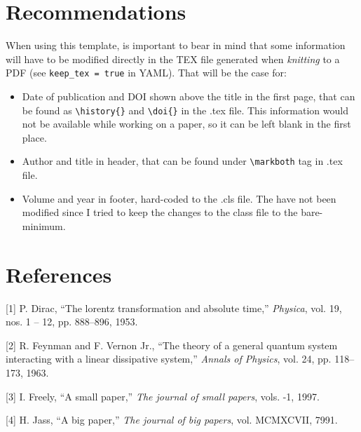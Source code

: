 \documentclass[]{latex/ieeeaccess}
\providecommand{\tightlist}{%
  \setlength{\itemsep}{0pt}\setlength{\parskip}{0pt}}
\begin{document}
\hypertarget{recommendations}{%
\section{Recommendations}\label{recommendations}}

When using this template, is important to bear in mind that some
information will have to be modified directly in the TEX file generated
when \emph{knitting} to a PDF (see \texttt{keep\_tex\ =\ true} in YAML).
That will be the case for:

\begin{itemize}
\tightlist
\item
  Date of publication and DOI shown above the title in the first page,
  that can be found as \texttt{\textbackslash{}history\{\}} and
  \texttt{\textbackslash{}doi\{\}} in the .tex file. This information
  would not be available while working on a paper, so it can be left
  blank in the first place.
\item
  Author and title in header, that can be found under
  \texttt{\textbackslash{}markboth} tag in .tex file.
\item
  Volume and year in footer, hard-coded to the .cls file. The have not
  been modified since I tried to keep the changes to the class file to
  the bare-minimum.
\end{itemize}

\hypertarget{references}{%
\section*{References}\label{references}}

\hypertarget{refs}{}
\leavevmode\hypertarget{ref-Dirac1953888}{}%
{[}1{]} P. Dirac, ``The lorentz transformation and absolute time,''
\emph{Physica}, vol. 19, nos. 1 -- 12, pp. 888--896, 1953.

\leavevmode\hypertarget{ref-Feynman1963118}{}%
{[}2{]} R. Feynman and F. Vernon Jr., ``The theory of a general quantum
system interacting with a linear dissipative system,'' \emph{Annals of
Physics}, vol. 24, pp. 118--173, 1963.

\leavevmode\hypertarget{ref-small}{}%
{[}3{]} I. Freely, ``A small paper,'' \emph{The journal of small
papers}, vols. -1, 1997.

\leavevmode\hypertarget{ref-big}{}%
{[}4{]} H. Jass, ``A big paper,'' \emph{The journal of big papers}, vol.
MCMXCVII, 7991.

\end{document}
